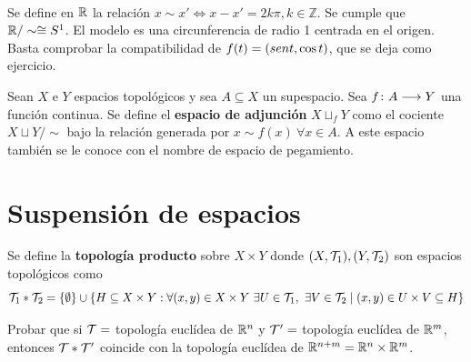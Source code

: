 \documentclass[GTS.tex]{subfiles}
\begin{document}
\begin{ej}\

\end{ej}

\begin{ej} Se define en $\mathbb{R}$ la relación $x\sim x'\Leftrightarrow x-x'=2k\pi,k\in\mathbb{Z}$. Se cumple que $\mathbb{R}/\sim\cong S^1$. El modelo es una circunferencia de radio 1 centrada en el origen. Basta comprobar la compatibilidad de $f(t)=(sen t,\cos{t})$, que se deja como ejercicio.
\end{ej}

\begin{defi} Sean $X$ e $Y$ espacios topológicos y sea $A\subseteq X$ un supespacio. Sea $f\colon{A}\longrightarrow{Y}$ una función continua. Se define el \textbf{espacio de adjunción} $X\sqcup_f Y$ como el cociente $X\sqcup Y/\sim$ bajo la relación generada por $x\sim f(x)\ \forall x\in A$. A este espacio también se le conoce con el nombre de espacio de pegamiento.
\end{defi}

\section{Suspensión de espacios}
\begin{defi}Se define la \textbf{topología producto} sobre $X\times Y$ donde $(X,\mathcal{T}_1), (Y,\mathcal{T}_2)$ son espacios topológicos como
\[
\mathcal{T}_1*\mathcal{T}_2=\{\emptyset\}\cup\{H\subseteq X\times Y:\forall(x,y)\in X\times Y\ \exists U\in\mathcal{T}_1,\ \exists V\in\mathcal{T}_2\mid(x,y)\in U\times V\subseteq H\}
\]
\end{defi}

\begin{ejer}Probar que si $\mathcal{T}=$ topología euclídea de $\mathbb{R}^n$ y $\mathcal{T}'=$ topología euclídea de $\mathbb{R}^m$, entonces $\mathcal{T}*\mathcal{T}'$ coincide con la topología euclídea de $\mathbb{R}^{n+m}=\mathbb{R}^n\times\mathbb{R}^m$.
\end{ejer}
\end{document}
